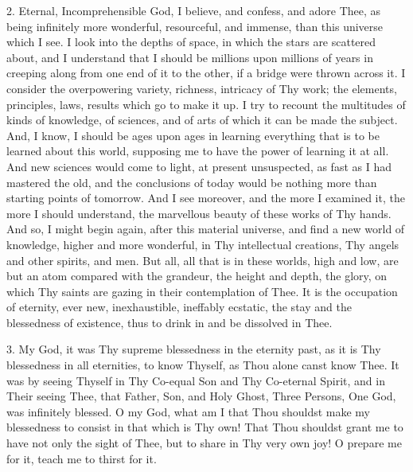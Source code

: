 2. Eternal, Incomprehensible
God, I believe, and confess, and adore Thee, as being infinitely more
wonderful, resourceful, and immense, than this universe which I see. I
look into the depths of space, in which the stars are scattered about,
and I understand that I should be millions upon millions of years in
creeping along from one end of it to the other, if a bridge were thrown
across it. I consider the overpowering variety, richness, intricacy of
Thy work; the elements, principles, laws, results which go to make it
up. I try to recount the multitudes of kinds of knowledge, of sciences,
and of arts of which it can be made the subject. And, I know, I should
be ages upon ages in learning everything that is to be learned about
this world, supposing me to have the power of learning it at all. And
new sciences would come to light, at present unsuspected, as fast as I
had mastered the old, and the conclusions of today would be nothing more
than starting points of tomorrow. And I see moreover, and the more I
examined it, the more I should understand, the marvellous beauty of
these works of Thy hands. And so, I might begin again, after this
material universe, and find a new world of knowledge, higher and more
wonderful, in Thy intellectual creations, Thy angels and other spirits,
and men. But all, all that is in these worlds, high and low, are but an
atom compared with the grandeur, the height and depth, the glory, on
which Thy saints are gazing in their contemplation of Thee. It is
the occupation of eternity, ever new, inexhaustible, ineffably ecstatic,
the stay and the blessedness of existence, thus to drink in and be
dissolved in Thee.

3. My God, it was Thy supreme
blessedness in the eternity past, as it is Thy blessedness in all
eternities, to know Thyself, as Thou alone canst know Thee. It was by
seeing Thyself in Thy Co-equal Son and Thy Co-eternal Spirit, and in
Their seeing Thee, that Father, Son, and Holy Ghost, Three Persons, One
God, was infinitely blessed. O my God, what am I that Thou shouldst make
my blessedness to consist in that which is Thy own! That Thou shouldst
grant me to have not only the sight of Thee, but to share in Thy very
own joy! O prepare me for it, teach me to thirst for it.


